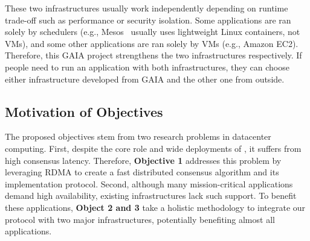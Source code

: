 These two infrastructures usually work independently depending on 
runtime trade-off such as performance or security isolation. Some applications 
are ran solely by schedulers (e.g., Mesos~\cite{mesos:nsdi11} usually uses 
lightweight Linux containers, not VMs), and some other applications are ran 
solely by VMs (e.g., Amazon EC2). Therefore, this GAIA project strengthens the 
two infrastructures respectively. If people need to run an application with 
both infrastructures, they can choose either infrastructure developed from 
GAIA and the other one from outside.





% 




\vspace{-.15in}\subsection{Motivation of Objectives} 
\label{sec:motivation}\vspace{-.075in}

The proposed objectives stem from two research problems in datacenter 
computing. First, despite the core role and wide deployments of \paxos, it 
suffers from high consensus latency. Therefore, 
\textbf{Objective 1} addresses this problem by leveraging RDMA to create a 
fast distributed consensus algorithm and its implementation protocol. Second, although many 
mission-critical applications demand high availability, existing infrastructures lack 
such support. To benefit these applications, \textbf{Object 2 and 3} take a 
holistic methodology to integrate our protocol with two major infrastructures,
potentially benefiting almost all applications.


